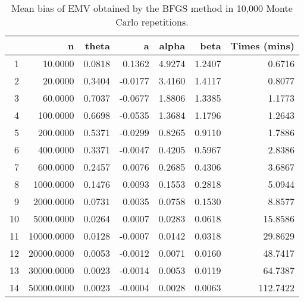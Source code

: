 \documentclass[12pt]{article}
\begin{document}
\thispagestyle{empty}
\begin{table}[ht]
\centering
\begin{tabular}{rrrrrrr}
  \hline
 & n & theta & a & alpha & beta & Times (mins) \\ 
  \hline
1 & 10.0000 & 0.0818 & 0.1362 & 4.9274 & 1.2407 & 0.6716 \\ 
  2 & 20.0000 & 0.3404 & -0.0177 & 3.4160 & 1.4117 & 0.8077 \\ 
  3 & 60.0000 & 0.7037 & -0.0677 & 1.8806 & 1.3385 & 1.1773 \\ 
  4 & 100.0000 & 0.6698 & -0.0535 & 1.3684 & 1.1796 & 1.2643 \\ 
  5 & 200.0000 & 0.5371 & -0.0299 & 0.8265 & 0.9110 & 1.7886 \\ 
  6 & 400.0000 & 0.3371 & -0.0047 & 0.4205 & 0.5967 & 2.8386 \\ 
  7 & 600.0000 & 0.2457 & 0.0076 & 0.2685 & 0.4306 & 3.6867 \\ 
  8 & 1000.0000 & 0.1476 & 0.0093 & 0.1553 & 0.2818 & 5.0944 \\ 
  9 & 2000.0000 & 0.0731 & 0.0035 & 0.0758 & 0.1530 & 8.8577 \\ 
  10 & 5000.0000 & 0.0264 & 0.0007 & 0.0283 & 0.0618 & 15.8586 \\ 
  11 & 10000.0000 & 0.0128 & -0.0007 & 0.0142 & 0.0318 & 29.8629 \\ 
  12 & 20000.0000 & 0.0053 & -0.0012 & 0.0071 & 0.0160 & 48.7417 \\ 
  13 & 30000.0000 & 0.0023 & -0.0014 & 0.0053 & 0.0119 & 64.7387 \\ 
  14 & 50000.0000 & 0.0023 & -0.0004 & 0.0028 & 0.0063 & 112.7422 \\ 
   \hline
\end{tabular}
\caption{Mean bias of EMV obtained by the BFGS method in 10,000 Monte Carlo repetitions.} 
\end{table}
\end{document}
